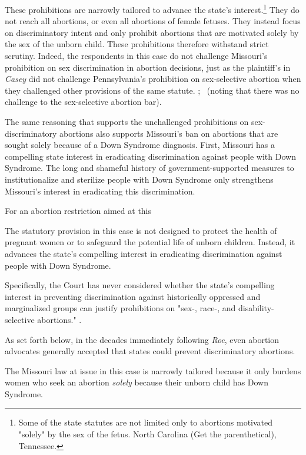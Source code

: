 \documentclass[12pt,\documentclassflag]{SCOTUS_Brief}
\begin{document}
These prohibitions are narrowly tailored to advance the state's interest.\footnote{Some of the state statutes are not limited only to abortions motivated "solely" by the sex of the fetus. \Seeeg North Carolina (Get the parenthetical), Tennessee.} They do not reach all abortions, or even all abortions of female fetuses. They instead focus on discriminatory intent and only prohibit abortions that are motivated solely by the sex of the unborn child. These prohibitions therefore withstand strict scrutiny. Indeed, the respondents in this case do not challenge Missouri's prohibition on sex discrimination in abortion decisions, just as the plaintiff's in \textit{Casey} \cite[!]{Casey} did not challenge Pennsylvania's prohibition on sex-selective abortion when they challenged other provisions of the same statute. \See {}; \seealso {}~(noting that there was no challenge to the sex-selective abortion bar).

The same reasoning that supports the unchallenged prohibitions on sex-discriminatory abortions also supports Missouri's ban on abortions that are sought solely because of a Down Syndrome diagnosis. First, Missouri has a compelling state interest in eradicating discrimination against people with Down Syndrome. The long and shameful history of government-supported measures to institutionalize and sterilize people with Down Syndrome only strengthens Missouri's interest in eradicating this discrimination.

For an abortion restriction aimed at this

The statutory provision in this case is not designed to protect the health of pregnant women or to safeguard the potential life of unborn children. Instead, it advances the state's compelling interest in eradicating discrimination against people with Down Syndrome.

Specifically, the Court has never considered whether the state's compelling interest in preventing discrimination against historically oppressed and marginalized groups can justify prohibitions on "sex-, race-, and disability-selective abortions." .

As set forth below, in the decades immediately following \textit{Roe}, even abortion advocates generally accepted that states could prevent discriminatory abortions.

The Missouri law at issue in this case is narrowly tailored because it only burdens women who seek an abortion \textit{solely} because their unborn child has Down Syndrome.
\end{document}
